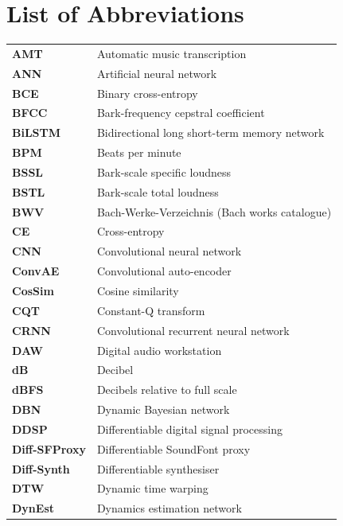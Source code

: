 
\chapter*{List of Abbreviations}

\begingroup
\setlength{\tabcolsep}{6pt}
\renewcommand{\arraystretch}{1.25}
\noindent
\begin{longtable}{@{}p{} p{}@{}}

\textbf{AMT}       & Automatic music transcription \\
\textbf{ANN}       & Artificial neural network \\

\textbf{BCE}       & Binary cross-entropy \\
\textbf{BFCC}      & Bark-frequency cepstral coefficient \\
\textbf{BiLSTM}    & Bidirectional long short-term memory network \\
\textbf{BPM}       & Beats per minute \\
\textbf{BSSL}      & Bark-scale specific loudness \\
\textbf{BSTL}      & Bark-scale total loudness \\
\textbf{BWV}       & Bach-Werke-Verzeichnis (Bach works catalogue) \\

\textbf{CE}        & Cross-entropy \\
\textbf{CNN}       & Convolutional neural network \\
\textbf{ConvAE}    & Convolutional auto-encoder \\
\textbf{CosSim}    & Cosine similarity \\
\textbf{CQT}       & Constant-Q transform \\
\textbf{CRNN}      & Convolutional recurrent neural network \\

\textbf{DAW}       & Digital audio workstation \\
\textbf{dB}        & Decibel \\
\textbf{dBFS}      & Decibels relative to full scale \\
\textbf{DBN}       & Dynamic Bayesian network \\
\textbf{DDSP}      & Differentiable digital signal processing \\
\textbf{Diff-SFProxy} & Differentiable SoundFont proxy \\
\textbf{Diff-Synth} & Differentiable synthesiser \\
\textbf{DTW}       & Dynamic time warping \\
\textbf{DynEst}    & Dynamics estimation network \\


\end{longtable}
